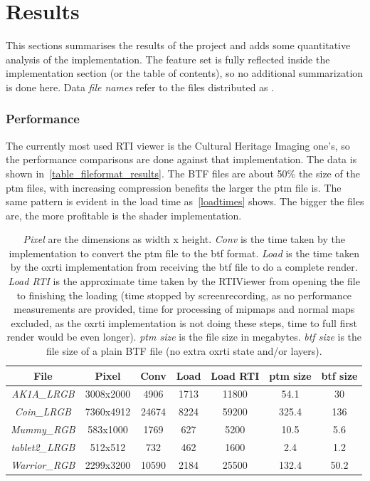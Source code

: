 \section{Results}
This sections summarises the results of the project and adds some quantitative
analysis of the implementation. The feature set is fully reflected inside the
implementation section (or the table of contents), so no additional
summarization is done here. Data \emph{file names} refer to the files distributed as \cite*{goslar_oxrti_data:_2018}.

\subsubsection{Performance}
The currently most used RTI viewer is the Cultural Heritage Imaging
one's\cite*{noauthor_cultural_nodate-1}, so the performance comparisons are done
against that implementation. The data is shown
in~\autoref{table_fileformat_results}. The BTF files are about 50\% the size of
the ptm files, with increasing compression benefits the larger the ptm file is.
The same pattern is evident in the load time as~\autoref{loadtimes} shows. The
bigger the files are, the more profitable is the shader implementation.

\begin{table}[H]
\begin{tabular}{|c |  c c c c c c|}
 \hline
 File & Pixel & Conv & Load & Load RTI & ptm size & btf size\\
  \hline
  \emph{AK1A\_LRGB} & 3008x2000 & 4906 & 1713 & 11800 & 54.1 & 30  \\
  \emph{Coin\_LRGB} & 7360x4912 & 24674 & 8224 & 59200 & 325.4 & 136  \\
  \emph{Mummy\_RGB} & 583x1000 & 1769 & 627 & 5200 & 10.5 & 5.6  \\
  \emph{tablet2\_LRGB} & 512x512 & 732 & 462 & 1600 & 2.4 & 1.2  \\
  \emph{Warrior\_RGB} & 2299x3200 & 10590 & 2184 & 25500 & 132.4 & 50.2  \\
 \hline
\end{tabular}
\caption[Performance Comparison]{\emph{Pixel} are the dimensions as width x height. \emph{Conv} is the time taken
by the implementation to convert the ptm file to the btf format. \emph{Load} is
the time taken by the oxrti implementation from receiving the btf file to do a complete render. \emph{Load
  RTI} is the approximate time taken by the RTIViewer from opening the file to
finishing the loading (time stopped by screenrecording, as no performance
measurements are provided, time for processing of mipmaps and normal maps
excluded, as the oxrti implementation is not doing these steps, time to full
first render would be even longer). \emph{ptm size} is the file size in
megabytes. \emph{btf size} is the file size of a plain BTF file (no extra oxrti
state and/or layers).}
\label{table_fileformat_results}
\end{table}

